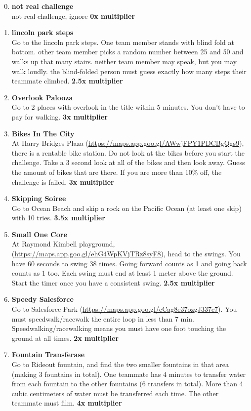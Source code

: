 \documentclass{article}
\begin{document}
\begin{enumerate}
    \setcounter{enumi}{-1}
    \item \textbf{not real challenge} \\ not real challenge, ignore \textbf{0x multiplier}
    \item \textbf{lincoln park steps} \\ Go to the lincoln park steps. One team member stands with blind fold at bottom. other team member picks a random number between 25 and 50 and walks up that many stairs. neither team member may speak, but you may walk loudly. the blind-folded person must guess exactly how many steps their teammate climbed. \textbf{2.5x multiplier}
    \item \textbf{Overlook Palooza} \\ Go to 2 places with overlook in the title within 5 minutes. You don't have to pay for walking. \textbf{3x multiplier}
    \item \textbf{Bikes In The City} \\ At Harry Bridges Plaza (\url{https://maps.app.goo.gl/AWwjFPY1PDCBgQgs9}), there is a rentable bike station. Do not look at the bikes before you start the challenge. Take a 3 second look at all of the bikes and then look away. Guess the amount of bikes that are there. If you are more than 10\% off, the challenge is failed. \textbf{3x multiplier} 
    \item \textbf{Skipping Soiree} \\ Go to Ocean Beach and skip a rock on the Pacific Ocean (at least one skip) with 10 tries. \textbf{3.5x multiplier}
    \item \textbf{Small One Core} \\ At Raymond Kimbell playground,  (\url{https://maps.app.goo.gl/ehG4WpKVjTRz8syF8}), head to the swings. You have 60 seconds to swing 38 times. Going forward counts as 1 and going back counts as 1 too. Each swing must end at least 1 meter above the ground. Start the timer once you have a consistent swing. \textbf{2.5x multiplier}
    \item \textbf{Speedy Salesforce} \\ Go to Salesforce Park (\url{https://maps.app.goo.gl/cCag8e37ozgJ337e7}). You must speedwalk/racewalk the entire loop in less than 7 min. Speedwalking/racewalking means you must have one foot touching the ground at all times. \textbf{2x multiplier}
    \item \textbf{Fountain Transferase} \\ Go to Rideout fountain, and find the two smaller fountains in that area (making 3 fountains in total). One teammate has 4 minutes to transfer water from each fountain to the other fountains (6 transfers in total). More than 4 cubic centimeters of water must be transferred each time. The other teammate must film. \textbf{4x multiplier}

\end{enumerate}
\end{document}

